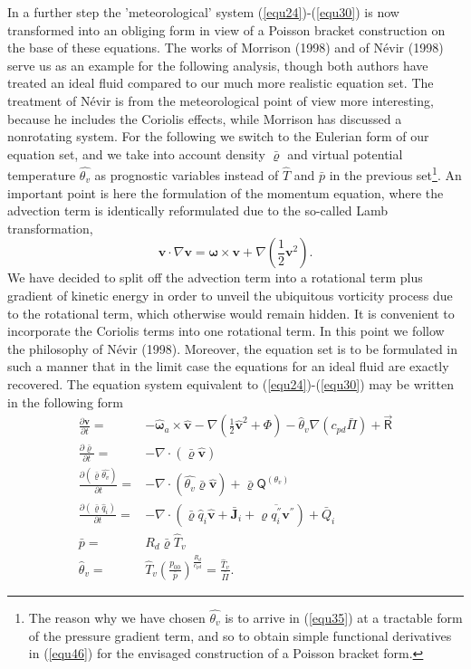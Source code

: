 In a further step the 'meteorological' system (\ref{equ24})-(\ref{equ30}) is now transformed into an obliging form in view of a Poisson bracket construction on the base of these equations. The works of Morrison (1998) and of N\'evir (1998) serve us as an example for the following analysis, though both authors have treated an ideal fluid compared to our much more realistic equation set. The treatment of N\'evir is from the meteorological point of view more interesting, because he includes the Coriolis effects, while Morrison has discussed a nonrotating system.  For the following we switch to the Eulerian form of our equation set, and we take into account density $\bar{\varrho}$ and virtual potential temperature $\hat{\theta_v}$  as prognostic variables instead of $\hat{T}$ and $\bar{p}$ in the previous set\footnote{The reason why we have chosen $\hat{\theta_v}$ is to arrive in (\ref{equ35}) at a tractable form of the pressure gradient term, and so to obtain simple functional derivatives in (\ref{equ46}) for the envisaged construction of a Poisson bracket form.}.
An important point is here the formulation of the momentum equation, where the advection term is identically reformulated due to the so-called Lamb transformation,
\begin{equation}
\mathbf{v} \cdot \nabla \mathbf{v} = \boldsymbol{\omega} \times \mathbf{v} + \nabla ( \frac{1}{2}\mathbf{v}^2 ) .\label{equ34}
\end{equation} 
We have decided to split off the advection term into a rotational term plus gradient of kinetic energy in order to unveil the ubiquitous vorticity process due to the rotational term, which otherwise would remain hidden. It is convenient to incorporate the Coriolis terms into one rotational term. In this point we follow the philosophy of N\'evir (1998). Moreover, the equation set is to be formulated in such a manner that in the limit case the equations for an ideal fluid are exactly recovered. The equation system equivalent to (\ref{equ24})-(\ref{equ30}) may be written in the following form
\begin{align}
\frac{\partial \hat{\mathbf{v}}}{\partial t} =& - \hat{\boldsymbol{\omega}}_a \times \hat{\mathbf{v}} - \nabla ( \frac{1}{2}\hat{\mathbf{v}}^2 + \Phi )
-\hat{\theta}_v \nabla (c_{pd}\bar{\Pi}) +  \vec{\mathsf{R}} \label{equ35} \\
\frac{\partial \bar{\varrho}}{\partial t} =& - \nabla \cdot ( \bar{\varrho} \hat{\mathbf{v}} )\label{equ36} \\
\frac{\partial (\bar{\varrho}\hat{\theta_v})}{\partial t} =& -\nabla \cdot ( \hat{\theta_v}\bar{\varrho} \hat{\mathbf{v}} )+ \bar{\varrho}\mathsf{Q}^{\left( \theta_v\right) }\label{equ37}\\
\frac{\partial ( \bar{\varrho} \hat{q}_i) }{\partial t} =& - \nabla \cdot( \bar{\varrho} \hat{q}_i \hat{\mathbf{v}} + \bar{\mathbf{J}}_i + \overline{\varrho q_i^{''}\mathbf{v}^{''}}) + \bar{Q}_i \label{equ38}\\
\bar{p} =& R_d\bar{\varrho} \hat{T}_v \label{equ39}\\
\hat{\theta}_v =& \hat{T}_v \left( \frac{p_{00}}{\bar{p}}\right)^{\frac{R_d}{c_{pd}}}=\frac{\hat{T}_v }{\bar{\Pi}}. \label{equ40}
\end{align}
